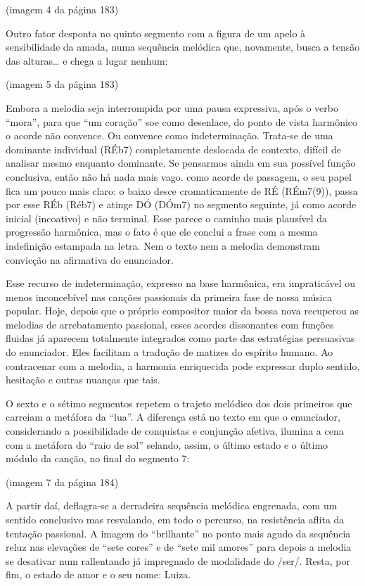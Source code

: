 (imagem 4 da página 183)

Outro fator desponta no quinto segmento com a figura de um apelo à
sensibilidade da amada, numa sequência melódica que, novamente, busca a
tensão das alturas\ldots{} e chega a lugar nenhum:

(imagem 5 da página 183)

Embora a melodia seja interrompida por uma pausa expressiva, após o
verbo ``mora'', para que ``um coração'' soe como desenlace, do ponto de
vista harmônico o acorde não convence. Ou convence como indeterminação.
Trata-se de uma dominante individual (RÉb7) completamente deslocada de
contexto, difícil de analisar mesmo enquanto dominante. Se pensarmos
ainda em sua possível função conclusiva, então não há nada mais vago.
como acorde de passagem, o seu papel fica um pouco mais claro: o baixo
desce cromaticamente de RÉ (RÉm7(9)), passa por esse RÉb (Réb7) e atinge
DÓ (DÓm7) no segmento seguinte, já como acorde inicial (incoativo) e não
terminal. Esse parece o caminho mais plausível da progressão harmônica,
mas o fato é que ele conclui a frase com a mesma indefinição estampada
na letra. Nem o texto nem a melodia demonstram convicção na afirmativa
do enunciador.~

Esse recurso de indeterminação, expresso na base harmônica, era
impraticável ou menos inconcebível nas canções passionais da primeira
fase de nossa música popular. Hoje, depois que o próprio compositor
maior da bossa nova recuperou as melodias de arrebatamento passional,
esses acordes dissonantes com funções fluidas já aparecem totalmente
integrados como parte das estratégias persuasivas do enunciador. Eles
facilitam a tradução de matizes do espírito humano. Ao contracenar com a
melodia, a harmonia enriquecida pode expressar duplo sentido, hesitação
e outras nuanças que tais.

O sexto e o sétimo segmentos repetem o trajeto melódico dos dois
primeiros que carreiam a metáfora da ``lua''. A diferença está no texto
em que o enunciador, considerando a possibilidade de conquistas e
conjunção afetiva, ilumina a cena com a metáfora do ``raio de sol''
selando, assim, o último estado e o último módulo da canção, no final do
segmento 7:

(imagem 7 da página 184)

A partir daí, deflagra-se a derradeira sequência melódica engrenada, com
um sentido conclusivo mas resvalando, em todo o percurso, na resistência
aflita da tentação passional. A imagem do ``brilhante'' no ponto mais
agudo da sequência reluz nas elevações de ``sete cores'' e de ``sete mil
amores'' para depois a melodia se desativar num rallentando já
impregnado de modalidade do /ser/. Resta, por fim, o estado de amor e o
seu nome: Luiza.

